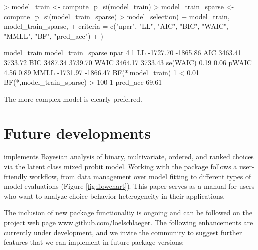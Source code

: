 \documentclass[article,shortnames]{jss}
\begin{document}
\begin{Schunk}
\begin{Sinput}
> model_train <- compute_p_si(model_train)
> model_train_sparse <- compute_p_si(model_train_sparse)
> model_selection(
+    model_train, model_train_sparse,
+    criteria = c("npar", "LL", "AIC", "BIC", "WAIC", "MMLL", "BF", "pred_acc")
+  )
\end{Sinput}
\begin{Soutput}
                         model_train model_train_sparse
npar                               4                  1
LL                          -1727.70           -1865.86
AIC                          3463.41            3733.72
BIC                          3487.34            3739.70
WAIC                         3464.17            3733.43
se(WAIC)                        0.19               0.06
pWAIC                           4.56               0.89
MMLL                        -1731.97           -1866.47
BF(*,model_train)                  1             < 0.01
BF(*,model_train_sparse)       > 100                  1
pred_acc                      69.61%
\end{Soutput}
\end{Schunk}

The more complex model is clearly preferred.

\section{Future developments} \label{sec:conclusion}

 implements Bayesian analysis of binary, multivariate, ordered, and ranked choices via the latent class mixed probit model. Working with the package follows a user-friendly workflow, from data management over model fitting to different types of model evaluations (Figure \ref{fig:flowchart}). This paper serves as a manual for  users who want to analyze choice behavior heterogeneity in their applications.

The inclusion of new package functionality is ongoing and can be followed on the project web page www.github.com/loelschlaeger. The following enhancements are currently under development, and we invite the community to suggest further features that we can implement in future package versions:
\end{document}

